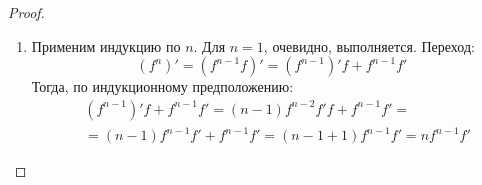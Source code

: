 \begin{normalsize}
\begin{proof}
\begin{enumerate}
        \item Применим индукцию по $n$. Для $n = 1$, очевидно, 
        выполняется. Переход:
        \[(f^n)' = (f^{n-1}f)' = (f^{n-1})'f + f^{n-1}f'\]
        Тогда, по индукционному предположению:
        \begin{align*}
            &(f^{n-1})'f + f^{n-1}f' = (n - 1)f^{n-2}f'f + f^{n-1}f' = \\
            &= (n - 1)f^{n-1}f' + f^{n-1}f' =
            (n - 1 + 1)f^{n-1}f' = nf^{n-1}f'
        \end{align*}
    \end{enumerate}

\end{proof}



\end{normalsize}